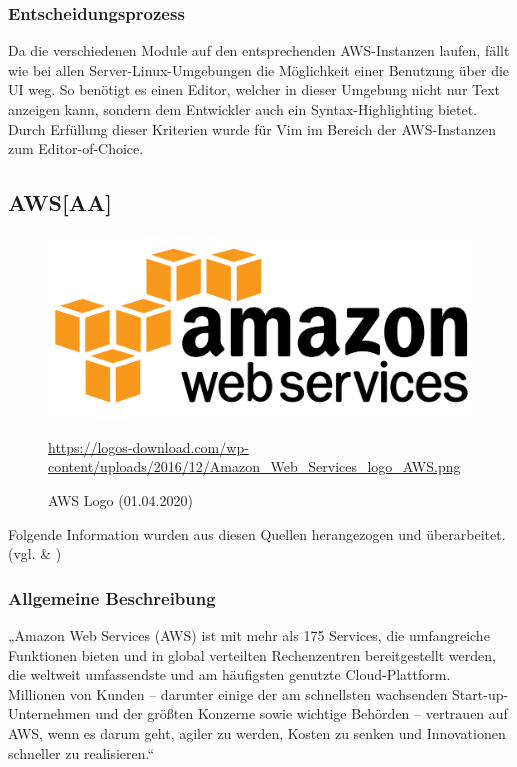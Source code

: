 \subsubsection{Entscheidungsprozess}
Da die verschiedenen Module auf den entsprechenden AWS-Instanzen laufen, fällt wie bei allen Server-Linux-Umgebungen die Möglichkeit einer Benutzung über die UI weg. So benötigt es einen Editor, welcher in dieser Umgebung nicht nur Text anzeigen kann, sondern dem Entwickler auch ein Syntax-Highlighting bietet. Durch Erfüllung dieser Kriterien wurde für Vim im Bereich der AWS-Instanzen zum Editor-of-Choice.

\newpage
\subsection{AWS[AA]}\label{ssec:aws}
\begin{figure}[H]
\centering
  \includegraphics[scale=0.1]{images/aws-logo.png}
  \caption[AWS Logo (01.04.2020)]{AWS Logo (01.04.2020)}
  \label{fig:awslogo}
  \url{https://logos-download.com/wp-content/uploads/2016/12/Amazon_Web_Services_logo_AWS.png}
\end{figure}
Folgende Information wurden aus diesen Quellen herangezogen und überarbeitet.\\ (vgl. \cite{amazon_was_2020} \& \cite{amazon_ec2_2020})
\subsubsection{Allgemeine Beschreibung}
„Amazon Web Services (AWS) ist mit mehr als 175 Services, die umfangreiche Funktionen bieten und in global verteilten Rechenzentren bereitgestellt werden, die weltweit umfassendste und am häufigsten genutzte Cloud-Plattform. Millionen von Kunden – darunter einige der am schnellsten wachsenden Start-up-Unternehmen und der größten Konzerne sowie wichtige Behörden – vertrauen auf AWS, wenn es darum geht, agiler zu werden, Kosten zu senken und Innovationen schneller zu realisieren.“~\cite{amazon_was_2020}
